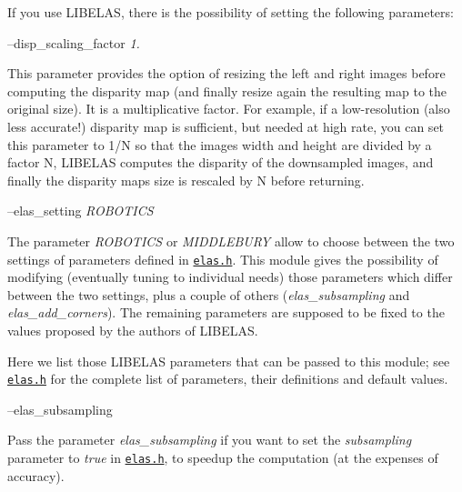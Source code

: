 If you use L\+I\+B\+E\+L\+AS, there is the possibility of setting the following parameters\+:

--disp\+\_\+scaling\+\_\+factor {\itshape 1.} 
\begin{DoxyItemize}
\item This parameter provides the option of resizing the left and right images before computing the disparity map (and finally resize again the resulting map to the original size). It is a multiplicative factor. For example, if a low-\/resolution (also less accurate!) disparity map is sufficient, but needed at high rate, you can set this parameter to 1/N so that the images width and height are divided by a factor N, L\+I\+B\+E\+L\+AS computes the disparity of the downsampled images, and finally the disparity map\textquotesingle{}s size is rescaled by N before returning.
\end{DoxyItemize}

--elas\+\_\+setting {\itshape R\+O\+B\+O\+T\+I\+CS} 
\begin{DoxyItemize}
\item The parameter {\itshape R\+O\+B\+O\+T\+I\+CS} or {\itshape M\+I\+D\+D\+L\+E\+B\+U\+RY} allow to choose between the two settings of parameters defined in \href{https://github.com/robotology/stereo-vision/tree/master/lib/elas/include/elas.h}{\tt elas.\+h}. This module gives the possibility of modifying (eventually tuning to individual needs) those parameters which differ between the two settings, plus a couple of others ({\itshape elas\+\_\+subsampling} and {\itshape elas\+\_\+add\+\_\+corners}). The remaining parameters are supposed to be fixed to the values proposed by the authors of L\+I\+B\+E\+L\+AS.
\end{DoxyItemize}

Here we list those L\+I\+B\+E\+L\+AS parameters that can be passed to this module; see \href{https://github.com/robotology/stereo-vision/tree/master/lib/elas/include/elas.h}{\tt elas.\+h} for the complete list of parameters, their definitions and default values.

--elas\+\_\+subsampling
\begin{DoxyItemize}
\item Pass the parameter {\itshape elas\+\_\+subsampling} if you want to set the {\itshape subsampling} parameter to {\itshape true} in \href{https://github.com/robotology/stereo-vision/tree/master/lib/elas/include/elas.h}{\tt elas.\+h}, to speedup the computation (at the expenses of accuracy).
\end{DoxyItemize}

